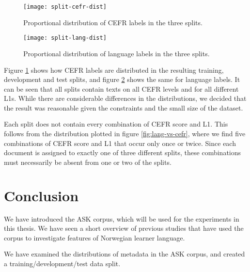 \begin{figure}
  \centering
  \texttt{[image: split-cefr-dist]}
  \caption{Proportional distribution of CEFR labels in the three splits.}
  \label{fig:split-cefr-dist}
\end{figure}

\begin{figure}
  \centering
  \texttt{[image: split-lang-dist]}
  \caption{Proportional distribution of language labels in the three splits.}
  \label{fig:split-lang-dist}
\end{figure}

Figure \ref{fig:split-cefr-dist} shows how CEFR labels are distributed in the
resulting training, development and test splits, and figure
\ref{fig:split-lang-dist} shows the same for language labels. It can be seen
that all splits contain texts on all CEFR levels and for all different
\acp{L1}. While there are considerable differences in the distributions, we
decided that the result was reasonable given the constraints and the small
size of the dataset.

Each split does not contain every combination of CEFR score and \ac{L1}. This
follows from the distribution plotted in figure \ref{fig:lang-vs-cefr}, where
we find five combinations of CEFR score and \ac{L1} that occur only once or
twice. Since each document is assigned to exactly one of three different
splits, these combinations must necessarily be absent from one or two of the
splits.


\section{Conclusion}

We have introduced the ASK corpus, which will be used for the experiments in
this thesis. We have seen a short overview of previous studies that have used
the corpus to investigate features of Norwegian learner language.

We have examined the distributions of metadata in the ASK corpus, and created
a training/development/test data split.
